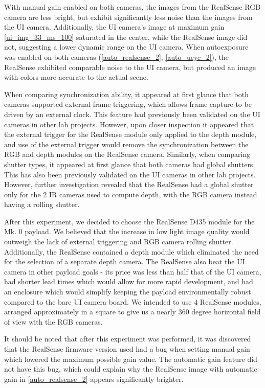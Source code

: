\begin{description}
	With manual gain enabled on both cameras, the images from the RealSense RGB camera are less bright, but exhibit significantly less noise than the images from the UI camera. Additionally, the UI camera's image at maximum gain \ref{ui_img_33_ms_100} saturated in the center, while the RealSense image did not, suggesting a lower dynamic range on the UI camera. When autoexposure was enabled on both cameras (\ref{auto_realsense_2}, \ref{auto_ueye_2}), the RealSense exhibited comparable noise to the UI camera, but produced an image with colors more accurate to the actual scene.
	
	When comparing synchronization ability, it appeared at first glance that both cameras supported external frame triggering, which allows frame capture to be driven by an external clock. This feature had previously been validated on the UI cameras in other lab projects. However, upon closer inspection it appeared that the external trigger for the RealSense module only applied to the depth module, and use of the external trigger would remove the synchronization between the RGB and depth modules on the RealSense camera. Similarly, when comparing shutter types, it appeared at first glance that both cameras had global shutters. This has also been previously validated on the UI cameras in other lab projects. However, further investigation revealed that the RealSense had a global shutter only for the 2 IR cameras used to compute depth, with the RGB camera instead having a rolling shutter.
	
	After this experiment, we decided to choose the RealSense D435 module for the Mk. 0 payload. We believed that the increase in low light image quality would outweigh the lack of external triggering and RGB camera rolling shutter. Additionally, the RealSense contained a depth module which eliminated the need for the selection of a separate depth camera. The RealSense also beat the UI camera in other payload goals - its price was less than half that of the UI camera, had shorter lead times which would allow for more rapid development, and had an enclosure which would simplify keeping the payload environmentally robust compared to the bare UI camera board. We intended to use 4 RealSense modules, arranged approximately in a square to give us a nearly 360 degree horizontal field of view with the RGB cameras.
	
	It should be noted that after this experiment was performed, it was discovered that the RealSense firmware version used had a bug when setting manual gain which lowered the maximum possible gain value. The automatic gain feature did not have this bug, which could explain why the RealSense image with automatic gain in \ref{auto_realsense_2} appears significantly brighter.
	

\end{description}
